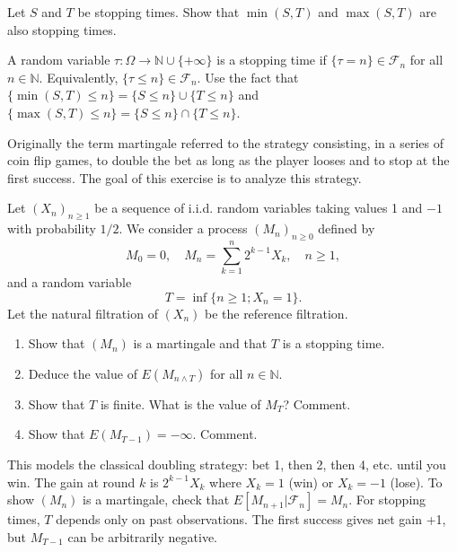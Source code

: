 \begin{exercise}
Let \(S\) and \(T\) be stopping times. Show that \(\min(S, T)\) and \(\max(S, T)\) are also stopping times.

\begin{reminder}
A random variable \(\tau: \Omega \to \mathbb{N} \cup \{+\infty\}\) is a stopping time if \(\{\tau = n\} \in \mathcal{F}_n\) for all \(n \in \mathbb{N}\). Equivalently, \(\{\tau \leq n\} \in \mathcal{F}_n\). Use the fact that \(\{\min(S,T) \leq n\} = \{S \leq n\} \cup \{T \leq n\}\) and \(\{\max(S,T) \leq n\} = \{S \leq n\} \cap \{T \leq n\}\).
\end{reminder}
\end{exercise}

\begin{exercise}
Originally the term martingale referred to the strategy consisting, in a series of coin flip games, to double the bet as long as the player looses and to stop at the first success. The goal of this exercise is to analyze this strategy.

Let \((X_n)_{n \geq 1}\) be a sequence of i.i.d. random variables taking values 1 and \(-1\) with probability \(1/2\). We consider a process \((M_n)_{n \geq 0}\) defined by
\[M_0 = 0, \quad M_n = \sum_{k=1}^n 2^{k-1}X_k, \quad n \geq 1,\]
and a random variable
\[T = \inf\{n \geq 1; X_n = 1\}.\]
Let the natural filtration of \((X_n)\) be the reference filtration.
\begin{enumerate}
    \item Show that \((M_n)\) is a martingale and that \(T\) is a stopping time.
    \item Deduce the value of \(E(M_{n \wedge T})\) for all \(n \in \mathbb{N}\).
    \item Show that \(T\) is finite. What is the value of \(M_T\)? Comment.
    \item Show that \(E(M_{T-1}) = -\infty\). Comment.
\end{enumerate}

\begin{reminder}
This models the classical doubling strategy: bet 1, then 2, then 4, etc. until you win. The gain at round \(k\) is \(2^{k-1}X_k\) where \(X_k = 1\) (win) or \(X_k = -1\) (lose). To show \((M_n)\) is a martingale, check that \(E[M_{n+1}|\mathcal{F}_n] = M_n\). For stopping times, \(T\) depends only on past observations. The first success gives net gain +1, but \(M_{T-1}\) can be arbitrarily negative.
\end{reminder}
\end{exercise}

